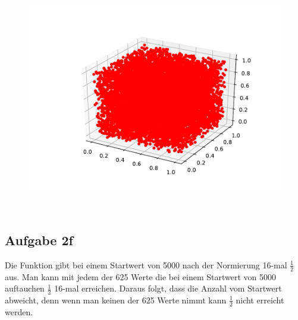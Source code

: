 \begin{figure}[H]
  \includegraphics[height=10cm]{Python/Aufgabe2e3.pdf}
\end{figure}

\subsection*{Aufgabe 2f}
Die Funktion gibt bei einem Startwert von 5000 nach der Normierung 16-mal $\frac{1}{2}$ aus. Man kann mit jedem der 625 Werte die bei einem Startwert von 5000 auftauchen $\frac{1}{2}$ 16-mal erreichen. Daraus folgt, dass die Anzahl vom Startwert abweicht, denn wenn man keinen der 625 Werte nimmt kann $\frac{1}{2}$ nicht erreicht werden.
